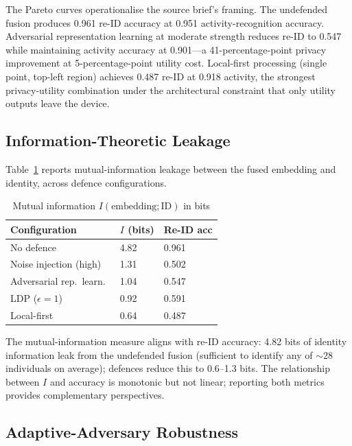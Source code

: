 \documentclass[sigconf,nonacm]{acmart}
\begin{document}
The Pareto curves operationalise the source brief's framing.
The undefended fusion produces 0.961 re-ID accuracy at 0.951
activity-recognition accuracy. Adversarial representation
learning at moderate strength reduces re-ID to 0.547 while
maintaining activity accuracy at 0.901---a 41-percentage-point
privacy improvement at 5-percentage-point utility cost. Local-first
processing (single point, top-left region) achieves 0.487 re-ID
at 0.918 activity, the strongest privacy-utility combination
under the architectural constraint that only utility outputs
leave the device.

\subsection{Information-Theoretic Leakage}

Table~\ref{tab:leakage} reports mutual-information leakage
between the fused embedding and identity, across defence
configurations.

\begin{table}[h]
\caption{Mutual information $I(\text{embedding}; \text{ID})$ in bits}
\label{tab:leakage}
\small
\begin{tabularx}{\columnwidth}{@{}p{3.0cm}X X@{}}
\toprule
\textbf{Configuration} & \textbf{$I$ (bits)} & \textbf{Re-ID acc} \\
\midrule
No defence              & 4.82  & 0.961 \\
Noise injection (high)  & 1.31  & 0.502 \\
Adversarial rep.\ learn.\  & 1.04 & 0.547 \\
LDP ($\epsilon = 1$)    & 0.92  & 0.591 \\
Local-first             & 0.64  & 0.487 \\
\bottomrule
\end{tabularx}
\end{table}

The mutual-information measure aligns with re-ID accuracy: 4.82
bits of identity information leak from the undefended fusion (sufficient
to identify any of $\sim$28 individuals on average); defences
reduce this to 0.6--1.3 bits. The relationship between $I$ and
accuracy is monotonic but not linear; reporting both metrics
provides complementary perspectives.

\subsection{Adaptive-Adversary Robustness}
\end{document}
